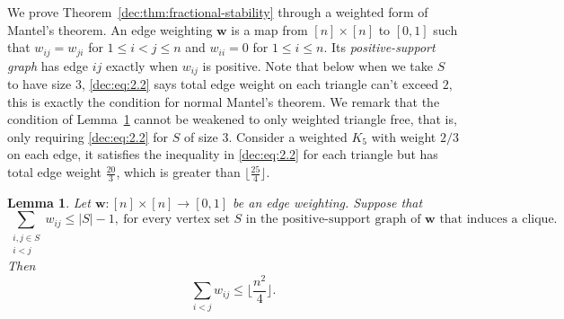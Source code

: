 \documentclass[11pt]{article}
\numberwithin{equation}{section}
\newtheorem{lemma}[theorem]{Lemma}
\theoremstyle{remark}
\begin{document}
We prove Theorem~\ref{dec:thm:fractional-stability} through a weighted form of Mantel's theorem.
An edge weighting \(\mathbf{w}\) is a map from \([n]\times[n]\) to \([0,1]\) such that
\(w_{ij}=w_{ji}\) for \(1\le i<j\le n\) and \(w_{ii}=0\) for \(1\le i\le n\).
Its \emph{positive-support graph} has edge \(ij\) exactly when \(w_{ij}\) is positive.
Note that below when we take \(S\) to have size \(3\), \eqref{dec:eq:2.2} says total edge weight on
each triangle can't exceed \(2\), this is exactly the condition for normal Mantel's theorem.
We remark that the condition of Lemma~\ref{dec:lem:weighted-mantel} cannot be weakened to only
weighted triangle free, that is, only requiring \eqref{dec:eq:2.2} for \(S\) of size \(3\).
Consider a weighted \(K_5\) with weight \(2/3\) on each edge, it satisfies the inequality in \eqref{dec:eq:2.2}
for each triangle but has total edge weight \(\frac{20}3\), which is greater than \(\lfloor\frac{25}{4}\rfloor\).

\begin{lemma}
  \label{dec:lem:weighted-mantel}
Let \(\mathbf{w}:[n]\times[n]\to[0,1]\) be an edge weighting.
Suppose that
\begin{equation}\label{dec:eq:2.2}
  \sum_{\substack{i,j\in S\\i<j}}w_{ij}\le |S|-1,\ \text{for\ every\ vertex\ set\ }S\text{\ in\ the\ positive-support\ graph\ of\ }\mathbf w \text{\ that\ induces\ a\ clique}.
\end{equation}
Then
\begin{equation*}
  \sum_{i<j}w_{ij}\le \lfloor\frac{n^2}{4}\rfloor.
\end{equation*}
\end{lemma}
\end{document}
